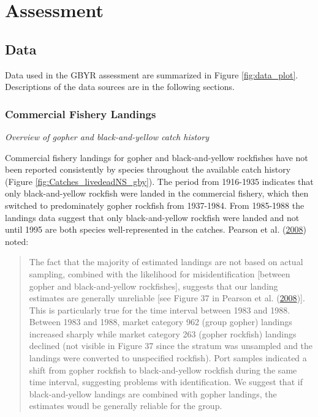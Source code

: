 \documentclass[12pt,]{article}
\begin{document}
\section{Assessment}\label{assessment}

\subsection{Data}\label{data}

Data used in the GBYR assessment are summarized in Figure
\ref{fig:data_plot}. Descriptions of the data sources are in the
following sections.

\subsubsection{Commercial Fishery
Landings}\label{commercial-fishery-landings}

\emph{Overview of gopher and black-and-yellow catch history}

Commercial fishery landings for gopher and black-and-yellow rockfishes
have not been reported consistently by species throughout the available
catch history (Figure \ref{fig:Catches_livedeadNS_gby}). The period from
1916-1935 indicates that only black-and-yellow rockfish were landed in
the commercial fishery, which then switched to predominately gopher
rockfish from 1937-1984. From 1985-1988 the landings data suggest that
only black-and-yellow rockfish were landed and not until 1995 are both
species well-represented in the catches. Pearson et al.
(\protect\hyperlink{ref-Pearson2008}{2008}) noted:

\begin{quote}
The fact that the majority of estimated landings are not based on actual
sampling, combined with the likelihood for misidentification {[}between
gopher and black-and-yellow rockfishes{]}, suggests that our landing
estimates are generally unreliable {[}see Figure 37 in Pearson et al.
(\protect\hyperlink{ref-Pearson2008}{2008}){]}. This is particularly
true for the time interval between 1983 and 1988. Between 1983 and 1988,
market category 962 (group gopher) landings increased sharply while
market category 263 (gopher rockfish) landings declined (not visible in
Figure 37 since the stratum was unsampled and the landings were
converted to unspecified rockfish). Port samples indicated a shift from
gopher rockfish to black-and-yellow rockfish during the same time
interval, suggesting problems with identification. We suggest that if
black-and-yellow landings are combined with gopher landings, the
estimates woudl be generally reliable for the group.
\end{quote}
\end{document}
